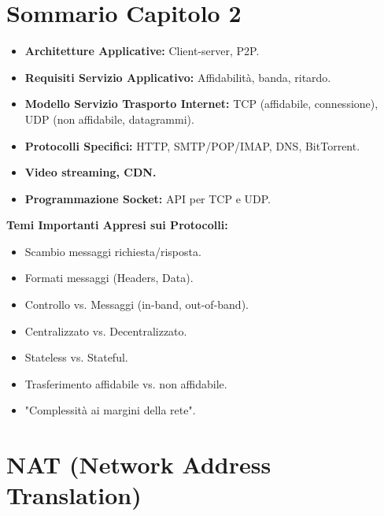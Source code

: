 \documentclass{article}
\begin{document}
\section{Sommario Capitolo 2}
\begin{itemize}
    \item \textbf{Architetture Applicative:} Client-server, P2P.
    \item \textbf{Requisiti Servizio Applicativo:} Affidabilità, banda, ritardo.
    \item \textbf{Modello Servizio Trasporto Internet:} TCP (affidabile, connessione), UDP (non affidabile, datagrammi).
    \item \textbf{Protocolli Specifici:} HTTP, SMTP/POP/IMAP, DNS, BitTorrent.
    \item \textbf{Video streaming, CDN.}
    \item \textbf{Programmazione Socket:} API per TCP e UDP.
\end{itemize}
\textbf{Temi Importanti Appresi sui Protocolli:}
\begin{itemize}
    \item Scambio messaggi richiesta/risposta.
    \item Formati messaggi (Headers, Data).
    \item Controllo vs. Messaggi (in-band, out-of-band).
    \item Centralizzato vs. Decentralizzato.
    \item Stateless vs. Stateful.
    \item Trasferimento affidabile vs. non affidabile.
    \item "Complessità ai margini della rete".
\end{itemize}

\appendix
\section{NAT (Network Address Translation)}
\end{document}
